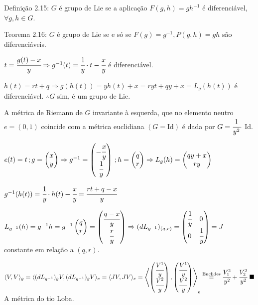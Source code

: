 \documentclass[10pt,a4paper]{article}
\begin{document}
		Defini\c{c}\~ao 2.15: $G$ \'e grupo de Lie se a aplica\c{c}\~ao $F(g,h) = gh^{-1}$ \'e diferenci\'avel, $\forall g,h \in G$.

		Teorema 2.16: $G$ \'e grupo de Lie se e s\'o se $F(g) = g^{-1}, P(g,h) = gh$ s\~ao diferenci\'aveis.

		$t = \cfrac{g(t) - x}{y} \Rightarrow g^{-1}(t) = \cfrac{1}{y} \cdot t - \cfrac{x}{y}$ \'e diferenci\'avel.

		$h(t) = rt + q \Rightarrow g(h(t)) = yh(t) + x = ryt + qy + x = L_g(h(t))$ \'e diferenci\'avel. $\therefore G$ sim, \'e um grupo de Lie.

		\vspace{3mm}

		A m\'etrica de Riemann de $G$ invariante \`a esquerda, que no elemento neutro $e = (0, 1)$ coincide com a m\'etrica euclidiana $(G = \text{Id})$ \'e dada por $G = \cfrac{1}{y^2} \cdot$ Id.

		\vspace{3mm}

		$e(t) = t\,;g = \left(\begin{matrix} x \\ y \end{matrix} \right) \Rightarrow g^{-1} = \left(\begin{matrix} -\cfrac{x}{y} \\ \cfrac{1}{y} \end{matrix} \right)\,;h = \left(\begin{matrix} q \\ r \end{matrix} \right) \Rightarrow L_g (h) =\left(\begin{matrix} qy + x \\ ry \end{matrix} \right)$

		$g^{-1}(h(t)) = \cfrac{1}{y} \cdot h(t) - \cfrac{x}{y} = \cfrac{rt + q - x}{y}$

		$L_{g^{-1}}(h) = g^{-1} h = g^{-1}\left(\begin{matrix} q \\ r \end{matrix} \right) = \left(\begin{matrix} \cfrac{q-x}{y} \\ \cfrac{r}{y} \end{matrix} \right) \Rightarrow (dL_{g^{-1}})_{(q,r)} = \left( \begin{matrix} \cfrac{1}{y} & 0 \\ 0 & \cfrac{1}{y} \end{matrix} \right) = J$ constante em rela\c{c}\~ao a $(q,r)$.

		$\langle V, V \rangle_g = \langle (dL_{g^{-1}})_g V, (dL_{g^{-1}})_g V \rangle_e = \langle J V, J V \rangle_e = \left\langle \left(\begin{matrix} \cfrac{V^1}{y} \\ \cfrac{V^2}{y} \end{matrix} \right), \left(\begin{matrix} \cfrac{V^1}{y} \\ \cfrac{V^2}{y} \end{matrix} \right) \right\rangle_e \stackrel{\text{Euclides}}{=} \cfrac{V_1^2}{y^2} + \cfrac{V_2^2}{y^2} \,\,\blacksquare$ A m\'etrica do tio Loba.
\end{document}
